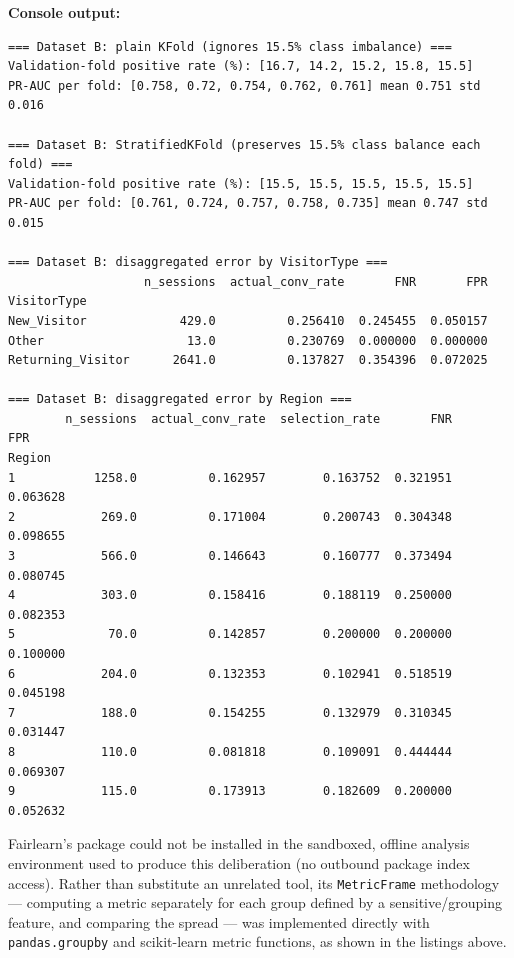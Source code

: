 

\textbf{Console output:}
\begin{lstlisting}
=== Dataset B: plain KFold (ignores 15.5% class imbalance) ===
Validation-fold positive rate (%): [16.7, 14.2, 15.2, 15.8, 15.5]
PR-AUC per fold: [0.758, 0.72, 0.754, 0.762, 0.761] mean 0.751 std 0.016

=== Dataset B: StratifiedKFold (preserves 15.5% class balance each fold) ===
Validation-fold positive rate (%): [15.5, 15.5, 15.5, 15.5, 15.5]
PR-AUC per fold: [0.761, 0.724, 0.757, 0.758, 0.735] mean 0.747 std 0.015

=== Dataset B: disaggregated error by VisitorType ===
                   n_sessions  actual_conv_rate       FNR       FPR
VisitorType
New_Visitor             429.0          0.256410  0.245455  0.050157
Other                    13.0          0.230769  0.000000  0.000000
Returning_Visitor      2641.0          0.137827  0.354396  0.072025

=== Dataset B: disaggregated error by Region ===
        n_sessions  actual_conv_rate  selection_rate       FNR       FPR
Region
1           1258.0          0.162957        0.163752  0.321951  0.063628
2            269.0          0.171004        0.200743  0.304348  0.098655
3            566.0          0.146643        0.160777  0.373494  0.080745
4            303.0          0.158416        0.188119  0.250000  0.082353
5             70.0          0.142857        0.200000  0.200000  0.100000
6            204.0          0.132353        0.102941  0.518519  0.045198
7            188.0          0.154255        0.132979  0.310345  0.031447
8            110.0          0.081818        0.109091  0.444444  0.069307
9            115.0          0.173913        0.182609  0.200000  0.052632
\end{lstlisting}

Fairlearn's package could not be installed in the sandboxed, offline analysis environment used to
produce this deliberation (no outbound package index access). Rather than substitute an unrelated
tool, its \texttt{MetricFrame} methodology --- computing a metric separately for each group defined
by a sensitive/grouping feature, and comparing the spread --- was implemented directly with
\texttt{pandas.groupby} and scikit-learn metric functions, as shown in the listings above.

